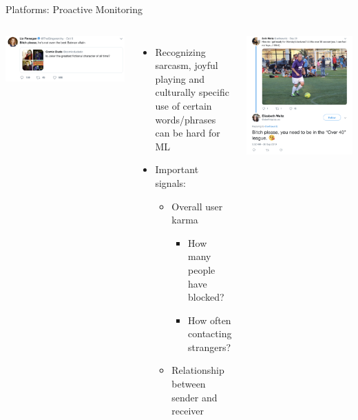 \documentclass[nobackground,dvipsnames,table,aspectratio=169]{beamer}
\begin{document}
\begin{frame}{Platforms: Proactive Monitoring}
    \begin{columns}
            \includegraphics[width=\textwidth]{false-positive-1}
            \begin{itemize}
                \item Recognizing sarcasm, joyful playing and culturally specific use of certain words/phrases can be hard for ML
                \item Important signals: 
                \begin{itemize}
                    \item Overall user karma
                    \begin{itemize}
                        \item How many people have blocked?
                        \item How often contacting strangers?
                    \end{itemize}
                    \item Relationship between sender and receiver
                \end{itemize}
            \end{itemize}
            \includegraphics[width=\textwidth]{false-positive-2}

\end{columns}
\end{frame}
\end{document}
